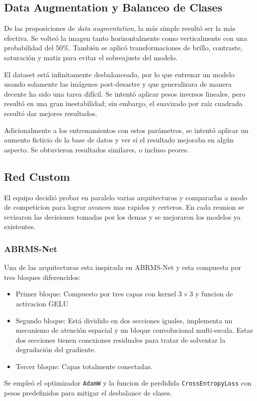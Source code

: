 \documentclass[11pt, a4paper]{article}
\begin{document}
\subsection{Data Augmentation y Balanceo de Clases}

De las proposiciones de \textit{data augmentation}, la más simple resultó ser la más efectiva. Se volteó la imagen tanto horizontalmente como verticalmente con una probabilidad del 50\%. También se aplicó transformaciones de brillo, contraste, saturación y matiz para evitar el sobreajuste del modelo. 

El dataset está infinitamente desbalanceado, por lo que entrenar un modelo usando solamente las imágenes post-desastre y que generalizara de manera decente ha sido una tarea difícil. Se intentó aplicar pesos inversos lineales, pero resultó en una gran inestabilidad; sin embargo, el suavizado por raíz cuadrada resultó dar mejores resultados.

Adicionalmente a los entrenamientos con estos parámetros, se intentó aplicar un aumento ficticio de la base de datos y ver si el resultado mejoraba en algún aspecto. Se obtuvieron resultados similares, o incluso peores.

\subsection{Red Custom}

El equipo decidió probar en paralelo varias arquitecturas y compararlas a modo de competicion para lograr avances mas rapidos y certeros. En cada reunion se revisaron las decisiones tomadas por los demas y se mejoraron los modelos ya existentes.


\subsubsection{ABRMS-Net}
Una de las arquitecturas esta inspirada en ABRMS-Net y esta compuesta por tres bloques diferencidos:

\begin{itemize}
  \item Primer bloque: Compuesto por tres capas con kernel $3\times3$ y funcion de activacion GELU
  \item Segundo bloque: Está dividido en dos secciones iguales, implementa un mecanismo de atención espacial y un bloque convolucional multi-escala. Estas dos secciones tienen conexiones residuales para tratar de solventar la degradación del gradiente.
  \item Tercer bloque: Capas totalmente conectadas.
\end{itemize}
Se empleó el optimizador \texttt{AdamW} y la funcion de perdidida \texttt{CrossEntropyLoss} con pesos predefinidos para mitigar el desbalance de clases.
\end{document}
